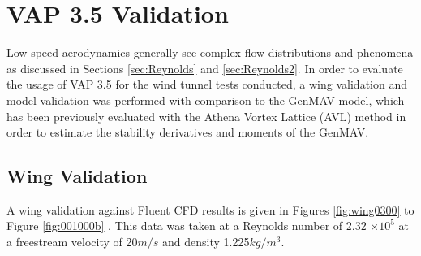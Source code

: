 \section{VAP 3.5 Validation}
Low-speed aerodynamics generally see complex flow distributions and phenomena as discussed in Sections \ref{sec:Reynolds} and \ref{sec:Reynolds2}. In order to evaluate the usage of VAP 3.5 for the wind tunnel tests conducted, a wing validation and model validation was performed with comparison to the GenMAV model, which has been previously evaluated with the Athena Vortex Lattice (AVL) method in order to estimate the stability derivatives and moments of the GenMAV. 


\subsection{Wing Validation}
A wing validation against Fluent CFD results is given in Figures \ref{fig:wing0300} to Figure \ref{fig:001000b} \cite{}. This data was taken at a Reynolds number of 2.32 $\times 10^{5}$ at a freestream velocity of 20$m/s$ and density 1.225$kg/m^3$. 

